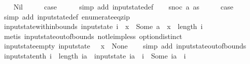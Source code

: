 \begin{isabellebody}
\ \ \isamarkupfalse%
\ Nil\isanewline
\ \ \isamarkupfalse%
\ \isamarkupfalse%
\ {\isacharquery}case\isanewline
\ \ \ \ \isamarkupfalse%
\ {\isacharparenleft}simp\ add{\isacharcolon}\ input{}state{\isacharunderscore}def{\isacharparenright}\isanewline
{}\isamarkupfalse%
\isanewline
\ \ \isamarkupfalse%
\ {\isacharparenleft}snoc\ a\ as{\isacharparenright}\isanewline
\ \ \isamarkupfalse%
\ \isamarkupfalse%
\ {\isacharquery}case\isanewline
\ \ \ \ \isamarkupfalse%
\ {\isacharparenleft}simp\ add{\isacharcolon}\ input{}state{\isacharunderscore}def\ enumerate{\isacharunderscore}eq{\isacharunderscore}zip{\isacharparenright}\isanewline
{}\isamarkupfalse%
%
\endisatagproof
{\isafoldproof}%
%
\isadelimproof
\isanewline
%
\endisadelimproof
\isanewline
{}\isamarkupfalse%
\ input{}state{\isacharunderscore}within{\isacharunderscore}bounds{\isacharcolon}\ {\isachardoublequoteopen}input{}state\ i\ {\isachardollar}\ x\ {\isacharequal}\ Some\ a\ {\isasymLongrightarrow}\ x\ {\isacharless}\ length\ i{\isachardoublequoteclose}\isanewline
%
\isadelimproof
\ \ %
\endisadelimproof
%
\isatagproof
{}\isamarkupfalse%
\ {\isacharparenleft}metis\ input{}state{\isacharunderscore}out{\isacharunderscore}of{\isacharunderscore}bounds\ not{\isacharunderscore}le{\isacharunderscore}imp{\isacharunderscore}less\ option{\isachardot}distinct{\isacharparenleft}{}{\isacharparenright}{\isacharparenright}%
\endisatagproof
{\isafoldproof}%
%
\isadelimproof
\isanewline
%
\endisadelimproof
\isanewline
{}\isamarkupfalse%
\ input{}state{\isacharunderscore}empty{\isacharcolon}\ {\isachardoublequoteopen}input{}state\ {\isacharbrackleft}{\isacharbrackright}\ {\isachardollar}\ x{}\ {\isacharequal}\ None{\isachardoublequoteclose}\isanewline
%
\isadelimproof
\ \ %
\endisadelimproof
%
\isatagproof
{}\isamarkupfalse%
\ {\isacharparenleft}simp\ add{\isacharcolon}\ input{}state{\isacharunderscore}out{\isacharunderscore}of{\isacharunderscore}bounds{\isacharparenright}%
\endisatagproof
{\isafoldproof}%
%
\isadelimproof
\isanewline
%
\endisadelimproof
\isanewline
{}\isamarkupfalse%
\ input{}state{\isacharunderscore}nth{\isacharcolon}\ {\isachardoublequoteopen}i\ {\isacharless}\ length\ ia\ {\isasymLongrightarrow}\ input{}state\ ia\ {\isachardollar}\ i\ {\isacharequal}\ Some\ {\isacharparenleft}ia\ {\isacharbang}\ i{\isacharparenright}{\isachardoublequoteclose}\isanewline

\end{isabellebody}
